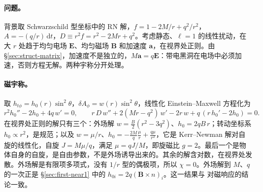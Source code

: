 \documentclass[11pt,a4paper]{ctexart}
\newcommand{\dd}{\mathrm d}
\begin{document}
\paragraph{问题。}背景取 Schwarzschild 型坐标中的 RN 解，$f=1-2M/r+q^2/r^2$，$A=-(q/r)\,\dd t$，$D\equiv r^2f=r^2-2Mr+q^2$。考虑静态、$\ell=1$ 的线性扰动，在大 $r$ 处趋于均匀电场 $\boldsymbol E$、均匀磁场 $\boldsymbol B$ 和加速度 $\boldsymbol a$，在视界处正则。由 \S\ref{sec:struct-matrix}，加速度不是独立的，$M\boldsymbol a=q\boldsymbol E$：带电黑洞在电场中必须加速，否则方程无解。两种宇称分开处理。

\paragraph{磁宇称。}取 $h_{t\phi}=h_0(r)\sin^2\theta$，$\delta A_\phi=w(r)\sin^2\theta$，线性化 Einstein--Maxwell 方程化为
\begin{equation}
r^2h_0''-2h_0+4q\,w'=0,\qquad r\,D\,w''+2(Mr-q^2)\,w'-2r\,w+q\,(r\,h_0'-2h_0)=0 .
\label{eq:dip-mag}
\end{equation}
在视界处正则的解只有三个：外场解 $w=\tfrac B2(r^2-3q^2)$、$h_0=2qB\,r$；转动坐标系 $h_0\propto r^2$，是规范；以及 $w=\mu/r$、$h_0=-\tfrac{2M}q\tfrac\mu r+\tfrac{q\mu}{r^2}$，它是 Kerr--Newman 解对自旋的线性化，自旋 $J=M\mu/q$，满足 $\mu=qJ/M$，即旋磁比 $g=2$。最后一个是物体自身的自旋，是自由参数，不是外场诱导出来的。其余的解含对数，在视界处发散。外场解是有限项多项式，没有 $1/r$ 型的偶极项，所以 $\chi=0$。外场解到 $M$、$q$ 的一次正是 \S\ref{sec:first-near1} 中的 $h_{0i}=2q(\boldsymbol B\times n)_i$。这一结果与 \citet{PereniguezCardoso2022} 对磁响应的结论一致。
\end{document}
